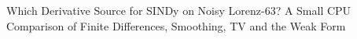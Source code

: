 Which Derivative Source for SINDy on Noisy Lorenz-63? A Small CPU Comparison of Finite Differences, Smoothing, TV and the Weak Form

